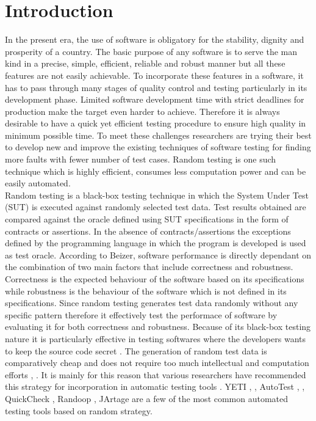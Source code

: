 \documentclass[10pt, conference, compsocconf]{IEEEtran}
\begin{document}
\section{Introduction}
In the present era, the use of software is obligatory for the stability, dignity and  prosperity of a country. The basic purpose of any software is to serve the man kind in a  precise, simple, efficient, reliable and robust manner but all these features are not easily achievable. To incorporate these features in a software, it has to pass through many stages of quality control and testing particularly in its development phase. Limited software development time with strict deadlines for production make the target even harder to achieve. Therefore it is always desirable to have a quick yet efficient testing procedure to ensure high quality in minimum possible time. To meet these challenges researchers are trying their best to develop new and improve the existing techniques of software testing for finding more faults with fewer number of test cases. Random testing is one such technique which is highly efficient, consumes less computation power and can be easily automated.\\

Random testing is a black-box testing technique in which the System Under Test (SUT) is executed against randomly selected test data. Test results obtained are compared against the oracle defined using SUT specifications in the form of contracts or assertions. In the absence of contracts/assertions the exceptions defined by the programming language in which the program is developed is used as test oracle. According to Beizer, \cite{Beizer1990} software performance is directly dependant on the combination of two main factors that include correctness and robustness. Correctness is the expected behaviour of the software based on its specifications while robustness is the behaviour of the software which is not defined in its specifications. Since random testing generates test data randomly without any specific pattern therefore it effectively test the performace of software by evaluating it for both correctness and robustness. Because of its black-box testing nature it is particularly effective in testing softwares where the developers wants to keep the source code secret \cite{Chen2010}. The generation of random test data is comparatively cheap and does not require too much intellectual and computation efforts \cite{Ciupa2009}, \cite{Ciupa2008}. It is mainly for this reason that various researchers have recommended this strategy for incorporation in automatic testing tools \cite{Ciupa2008a}. YETI \cite{Oriol2010a}, \cite{Oriol2010}, AutoTest \cite{Leitner2007}, \cite{Ciupa2007}, QuickCheck \cite{Claessen2000}, Randoop \cite{Pacheco2007}, JArtage \cite{Oriat2004} are a few of the most common automated testing tools based on random strategy.\\
\end{document}
